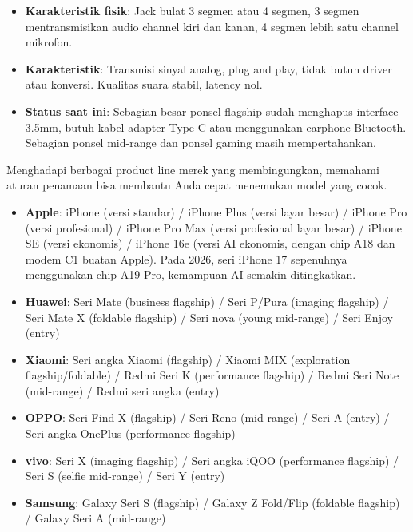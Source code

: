 
\begin{itemize}
  \item \textbf{Karakteristik fisik}: Jack bulat 3 segmen atau 4 segmen, 3 segmen mentransmisikan audio channel kiri dan kanan, 4 segmen lebih satu channel mikrofon.
  \item \textbf{Karakteristik}: Transmisi sinyal analog, plug and play, tidak butuh driver atau konversi. Kualitas suara stabil, latency nol.
  \item \textbf{Status saat ini}: Sebagian besar ponsel flagship sudah menghapus interface 3.5mm, butuh kabel adapter Type-C atau menggunakan earphone Bluetooth. Sebagian ponsel mid-range dan ponsel gaming masih mempertahankan.
\end{itemize}


Menghadapi berbagai product line merek yang membingungkan, memahami aturan penamaan bisa membantu Anda cepat menemukan model yang cocok.


\begin{itemize}
  \item \textbf{Apple}: iPhone (versi standar) / iPhone Plus (versi layar besar) / iPhone Pro (versi profesional) / iPhone Pro Max (versi profesional layar besar) / iPhone SE (versi ekonomis) / iPhone 16e (versi AI ekonomis, dengan chip A18 dan modem C1 buatan Apple). Pada 2026, seri iPhone 17 sepenuhnya menggunakan chip A19 Pro, kemampuan AI semakin ditingkatkan.
  \item \textbf{Huawei}: Seri Mate (business flagship) / Seri P/Pura (imaging flagship) / Seri Mate X (foldable flagship) / Seri nova (young mid-range) / Seri Enjoy (entry)
  \item \textbf{Xiaomi}: Seri angka Xiaomi (flagship) / Xiaomi MIX (exploration flagship/foldable) / Redmi Seri K (performance flagship) / Redmi Seri Note (mid-range) / Redmi seri angka (entry)
  \item \textbf{OPPO}: Seri Find X (flagship) / Seri Reno (mid-range) / Seri A (entry) / Seri angka OnePlus (performance flagship)
  \item \textbf{vivo}: Seri X (imaging flagship) / Seri angka iQOO (performance flagship) / Seri S (selfie mid-range) / Seri Y (entry)
  \item \textbf{Samsung}: Galaxy Seri S (flagship) / Galaxy Z Fold/Flip (foldable flagship) / Galaxy Seri A (mid-range)
\end{itemize}

